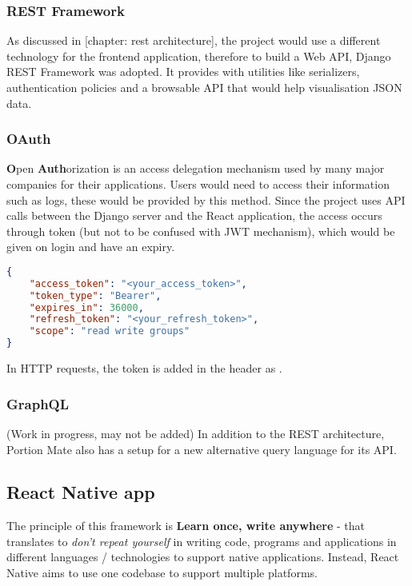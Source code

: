 \documentclass{l4proj}
\begin{document}
\subsubsection{REST Framework}

As discussed in [chapter: rest architecture], the project would use a different technology for the frontend application, therefore to build a Web API, Django REST Framework was adopted. It provides with utilities like serializers, authentication policies and a browsable API that would help visualisation JSON data.

\subsubsection{OAuth}

\textbf{O}pen \textbf{Auth}orization is an access delegation mechanism used by many major companies for their applications. Users would need to access their information such as logs, these would be provided by this method. Since the project uses API calls between the Django server and the React application, the access occurs through token (but not to be confused with JWT mechanism), which would be given on login and have an expiry.

\begin{lstlisting}[language=json, caption={Access token example}]
{
    "access_token": "<your_access_token>",
    "token_type": "Bearer",
    "expires_in": 36000,
    "refresh_token": "<your_refresh_token>",
    "scope": "read write groups"
}
\end{lstlisting}

In HTTP requests, the token is added in the header as .

\subsubsection{GraphQL}

(Work in progress, may not be added)
In addition to the REST architecture, Portion Mate also has a setup for a new alternative query language for its API.

\subsection{React Native app}

The principle of this framework is \textbf{Learn once, write anywhere} - that translates to \textit{don't repeat yourself} in writing code, programs and applications in different languages / technologies to support native applications. Instead, React Native aims to use one codebase to support multiple platforms.
\end{document}
